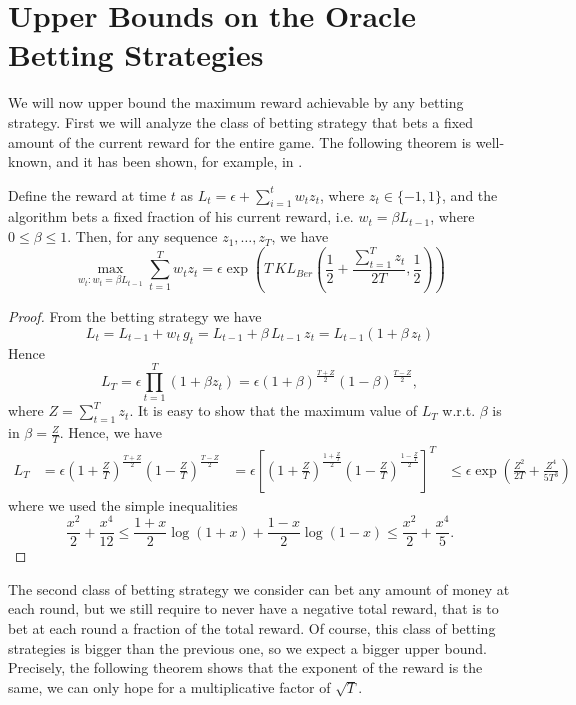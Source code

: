 \section{Upper Bounds on the Oracle Betting Strategies}

We will now upper bound the maximum reward achievable by any betting strategy.
First we will analyze the class of betting strategy that bets a fixed amount of the current reward for the entire game.
The following theorem is well-known, and it has been shown, for example, in \cite{}.

\begin{theorem}
\label{thm:oracle_fraction}
Define the reward at time $t$ as $L_t=\epsilon + \sum_{i=1}^t w_t z_t$, where $z_t\in \{-1,1\}$, and the algorithm bets a fixed fraction of his current reward, i.e. $w_t=\beta L_{t-1}$, where $0\leq\beta\leq1$. Then, for any sequence $z_1, \ldots, z_T$, we have
\[
\max_{w_t: w_t=\beta L_{t-1}} \sum_{t=1}^T w_t z_t 
= \epsilon \exp\left(T\, KL_{Ber}\left(\frac{1}{2}+\frac{\sum_{t=1}^T z_t}{2T},\frac{1}{2}\right)\right) 
\]
\end{theorem}
\begin{proof}
From the betting strategy we have
\[
L_t=L_{t-1} + w_t \, g_t = L_{t-1} + \beta \, L_{t-1} \, z_t = L_{t-1} (1+\beta \, z_t)
\]
Hence
\[
L_T=\epsilon \prod_{t=1}^T (1+\beta z_t) = \epsilon (1+\beta)^\frac{T+Z}{2} (1-\beta)^\frac{T-Z}{2},
\]
where $Z=\sum_{t=1}^T z_t$.
It is easy to show that the maximum value of $L_T$ w.r.t. $\beta$ is in $\beta=\frac{Z}{T}$. 
Hence, we have
\begin{align}
L_T &= \epsilon (1+\frac{Z}{T})^\frac{T+Z}{2} (1-\frac{Z}{T})^\frac{T-Z}{2} 
&= \epsilon \left[(1+\frac{Z}{T})^\frac{1+\frac{Z}{T}}{2} (1-\frac{Z}{T})^\frac{1-\frac{Z}{T}}{2}\right]^T 
&\leq \epsilon \exp \left(\frac{Z^2}{2 T} + \frac{Z^4}{5 T^3}\right)
\end{align}
where we used the simple inequalities
\[
\frac{x^2}{2} +\frac{x^4}{12}\leq \frac{1+x}{2} \log(1+x) + \frac{1-x}{2}\log(1-x) \leq \frac{x^2}{2} + \frac{x^4}{5}.
\]
\end{proof}

The second class of betting strategy we consider can bet any amount of money at each round, but we still require to never have a negative total reward, that is to bet at each round a fraction of the total reward. Of course, this class of betting strategies is bigger than the previous one, so we expect a bigger upper bound. Precisely, the following theorem shows that the exponent of the reward is the same, we can only hope for a multiplicative factor of $\sqrt{T}$.


